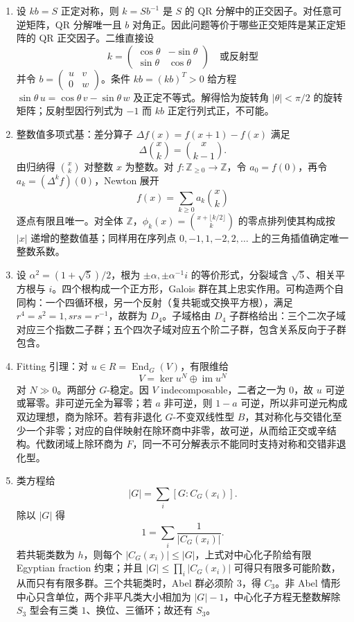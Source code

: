 \documentclass[UTF8,12pt]{ctexart}
\begin{document}
\begin{enumerate}[label=\textbf{\arabic*.},leftmargin=2.2em]
\item 设 \(kb=S\) 正定对称，则 \(k=Sb^{-1}\) 是 \(S\) 的 QR 分解中的正交因子。对任意可逆矩阵，QR 分解唯一且 \(b\) 对角正。因此问题等价于哪些正交矩阵是某正定矩阵的 QR 正交因子。二维直接设
\[
k=\begin{pmatrix}\cos\theta&-\sin\theta\\ \sin\theta&\cos\theta\end{pmatrix}
\quad\text{或反射型}
\]
并令 \(b=\begin{pmatrix}u&v\\0&w\end{pmatrix}\)。条件 \(kb=(kb)^T>0\) 给方程 \(\sin\theta\,u=\cos\theta\,v-\sin\theta\,w\) 及正定不等式。解得恰为旋转角 \(|\theta|<\pi/2\) 的旋转矩阵；反射型因行列式为 \(-1\) 而 \(kb\) 正定行列式正，不可能。
\item 整数值多项式基：差分算子 \(\Delta f(x)=f(x+1)-f(x)\) 满足
\[
\Delta\binom{x}{k}=\binom{x}{k-1}.
\]
由归纳得 \(\binom{x}{k}\) 对整数 \(x\) 为整数。对 \(f:\mathbb Z_{\ge0}\to\mathbb Z\)，令 \(a_0=f(0)\)，再令 \(a_k=(\Delta^k f)(0)\)，Newton 展开
\[
f(x)=\sum_{k\ge0}a_k\binom{x}{k}
\]
逐点有限且唯一。对全体 \(\mathbb Z\)，\(\phi_k(x)=\binom{x+\lfloor k/2\rfloor}{k}\) 的零点排列使其构成按 \(|x|\) 递增的整数值基；同样用在序列点 \(0,-1,1,-2,2,\ldots\) 上的三角插值确定唯一整数系数。
\item 设 \(\alpha^2=(1+\sqrt5)/2\)，根为 \(\pm\alpha,\pm\alpha^{-1}i\) 的等价形式，分裂域含 \(\sqrt5\)、相关平方根与 \(i\)。四个根构成一个正方形，Galois 群在其上忠实作用。可构造两个自同构：一个四循环根，另一个反射（复共轭或交换平方根），满足 \(r^4=s^2=1,srs=r^{-1}\)，故群为 \(D_4\)。子域格由 \(D_4\) 子群格给出：三个二次子域对应三个指数二子群；五个四次子域对应五个阶二子群，包含关系反向于子群包含。
\item Fitting 引理：对 \(u\in R=\operatorname{End}_G(V)\)，有限维给
\[
V=\ker u^N\oplus \operatorname{im}u^N
\]
对 \(N\gg0\)。两部分 \(G\)-稳定。因 \(V\) indecomposable，二者之一为 \(0\)，故 \(u\) 可逆或幂零。非可逆元全为幂零；若 \(a\) 非可逆，则 \(1-a\) 可逆，所以非可逆元构成双边理想，商为除环。若有非退化 \(G\)-不变双线性型 \(B\)，其对称化与交错化至少一个非零；对应的自伴映射在除环商中非零，故可逆，从而给正交或辛结构。代数闭域上除环商为 \(F\)，同一不可分解表示不能同时支持对称和交错非退化型。
\item 类方程给
\[
|G|=\sum_i [G:C_G(x_i)].
\]
除以 \(|G|\) 得
\[
1=\sum_i\frac1{|C_G(x_i)|}.
\]
若共轭类数为 \(h\)，则每个 \(|C_G(x_i)|\le |G|\)，上式对中心化子阶给有限 Egyptian fraction 约束；并且 \(|G|\le\prod_i |C_G(x_i)|\) 可得只有限多可能阶数，从而只有有限多群。三个共轭类时，Abel 群必须阶 \(3\)，得 \(C_3\)。非 Abel 情形中心只含单位，两个非平凡类大小相加为 \(|G|-1\)，中心化子方程无整数解除 \(S_3\) 型会有三类 \(1\)、换位、三循环；故还有 \(S_3\)。
\end{enumerate}
\end{document}

